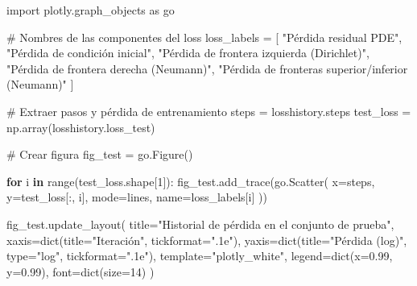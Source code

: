\documentclass[
  spanish,
  us-letterpaper,
]{scrreprt}
\newenvironment{Shaded}{\begin{snugshade}}{\end{snugshade}}
\newcommand{\BuiltInTok}[1]{\textcolor[rgb]{0.00,0.23,0.31}{#1}}
\newcommand{\CommentTok}[1]{\textcolor[rgb]{0.37,0.37,0.37}{#1}}
\newcommand{\ControlFlowTok}[1]{\textcolor[rgb]{0.00,0.23,0.31}{\textbf{#1}}}
\newcommand{\DecValTok}[1]{\textcolor[rgb]{0.68,0.00,0.00}{#1}}
\newcommand{\FloatTok}[1]{\textcolor[rgb]{0.68,0.00,0.00}{#1}}
\newcommand{\ImportTok}[1]{\textcolor[rgb]{0.00,0.46,0.62}{#1}}
\newcommand{\KeywordTok}[1]{\textcolor[rgb]{0.00,0.23,0.31}{\textbf{#1}}}
\newcommand{\NormalTok}[1]{\textcolor[rgb]{0.00,0.23,0.31}{#1}}
\newcommand{\OperatorTok}[1]{\textcolor[rgb]{0.37,0.37,0.37}{#1}}
\newcommand{\StringTok}[1]{\textcolor[rgb]{0.13,0.47,0.30}{#1}}
\theoremstyle{plain}
\theoremstyle{definition}
\theoremstyle{remark}
\begin{document}
\begin{Shaded}
\begin{Highlighting}[]
\ImportTok{import}\NormalTok{ plotly.graph\_objects }\ImportTok{as}\NormalTok{ go}

\CommentTok{\# Nombres de las componentes del loss}
\NormalTok{loss\_labels }\OperatorTok{=}\NormalTok{ [}
    \StringTok{"Pérdida residual PDE"}\NormalTok{,}
    \StringTok{"Pérdida de condición inicial"}\NormalTok{,}
    \StringTok{"Pérdida de frontera izquierda (Dirichlet)"}\NormalTok{,}
    \StringTok{"Pérdida de frontera derecha (Neumann)"}\NormalTok{,}
    \StringTok{"Pérdida de fronteras superior/inferior (Neumann)"}
\NormalTok{]}

\CommentTok{\# Extraer pasos y pérdida de entrenamiento}
\NormalTok{steps }\OperatorTok{=}\NormalTok{ losshistory.steps}
\NormalTok{test\_loss }\OperatorTok{=}\NormalTok{ np.array(losshistory.loss\_test)}

\CommentTok{\# Crear figura}
\NormalTok{fig\_test }\OperatorTok{=}\NormalTok{ go.Figure()}

\ControlFlowTok{for}\NormalTok{ i }\KeywordTok{in} \BuiltInTok{range}\NormalTok{(test\_loss.shape[}\DecValTok{1}\NormalTok{]):}
\NormalTok{    fig\_test.add\_trace(go.Scatter(}
\NormalTok{        x}\OperatorTok{=}\NormalTok{steps,}
\NormalTok{        y}\OperatorTok{=}\NormalTok{test\_loss[:, i],}
\NormalTok{        mode}\OperatorTok{=}\StringTok{\textquotesingle{}lines\textquotesingle{}}\NormalTok{,}
\NormalTok{        name}\OperatorTok{=}\NormalTok{loss\_labels[i]}
\NormalTok{    ))}

\NormalTok{fig\_test.update\_layout(}
\NormalTok{    title}\OperatorTok{=}\StringTok{"Historial de pérdida en el conjunto de prueba"}\NormalTok{,}
\NormalTok{    xaxis}\OperatorTok{=}\BuiltInTok{dict}\NormalTok{(title}\OperatorTok{=}\StringTok{"Iteración"}\NormalTok{, tickformat}\OperatorTok{=}\StringTok{".1e"}\NormalTok{),}
\NormalTok{    yaxis}\OperatorTok{=}\BuiltInTok{dict}\NormalTok{(title}\OperatorTok{=}\StringTok{"Pérdida (log)"}\NormalTok{, }\BuiltInTok{type}\OperatorTok{=}\StringTok{"log"}\NormalTok{, tickformat}\OperatorTok{=}\StringTok{".1e"}\NormalTok{),}
\NormalTok{    template}\OperatorTok{=}\StringTok{"plotly\_white"}\NormalTok{,}
\NormalTok{    legend}\OperatorTok{=}\BuiltInTok{dict}\NormalTok{(x}\OperatorTok{=}\FloatTok{0.99}\NormalTok{, y}\OperatorTok{=}\FloatTok{0.99}\NormalTok{),}
\NormalTok{    font}\OperatorTok{=}\BuiltInTok{dict}\NormalTok{(size}\OperatorTok{=}\DecValTok{14}\NormalTok{)}
\NormalTok{)}
\end{Highlighting}
\end{Shaded}
\end{document}
